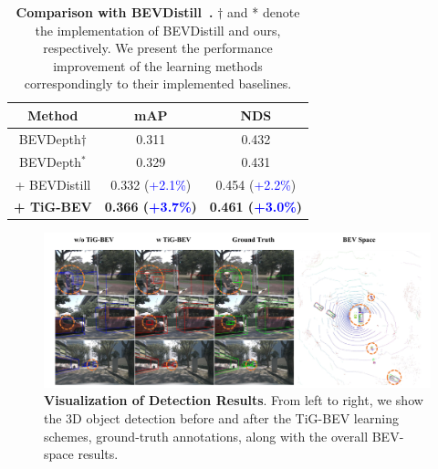 \begin{table}[t!]
\centering
    \caption{\textbf{Comparison with BEVDistill~\cite{b9}.} $\dagger$ and * denote the implementation of BEVDistill and ours, respectively. We present the performance improvement of the learning methods correspondingly to their implemented baselines.}
    \resizebox{1\columnwidth}{!}
    {
    \begin{tabular}{c|cc}
    \toprule[1.2pt]
          Method&mAP&NDS  \\
          \midrule
          BEVDepth$\dagger$ &0.311       &  0.432     \\
          \rowcolor{gray!12}BEVDepth$^*$ &0.329       &  0.431     \\
          \midrule
          + BEVDistill &0.332 (\textcolor{blue}{+2.1\%})       &  0.454 (\textcolor{blue}{+2.2\%})     \\
          \rowcolor{gray!12}\textbf{+ TiG-BEV} &\textbf{0.366 (\textcolor{blue}{+3.7\%})}       &  \textbf{0.461 (\textcolor{blue}{+3.0\%})}     \\ 
    \bottomrule[1.2pt]
    \end{tabular}}
    \label{cccc}
\end{table}
\begin{figure}[ht]
    \centering
    \includegraphics[scale=0.85]{cvpr_2022/det_result.pdf}
    \caption{\textbf{Visualization of Detection Results}. From left to right, we show the 3D object detection before and after the TiG-BEV learning schemes, ground-truth annotations, along with the overall BEV-space results.
    }
    \label{fig:aabb}
\end{figure}
